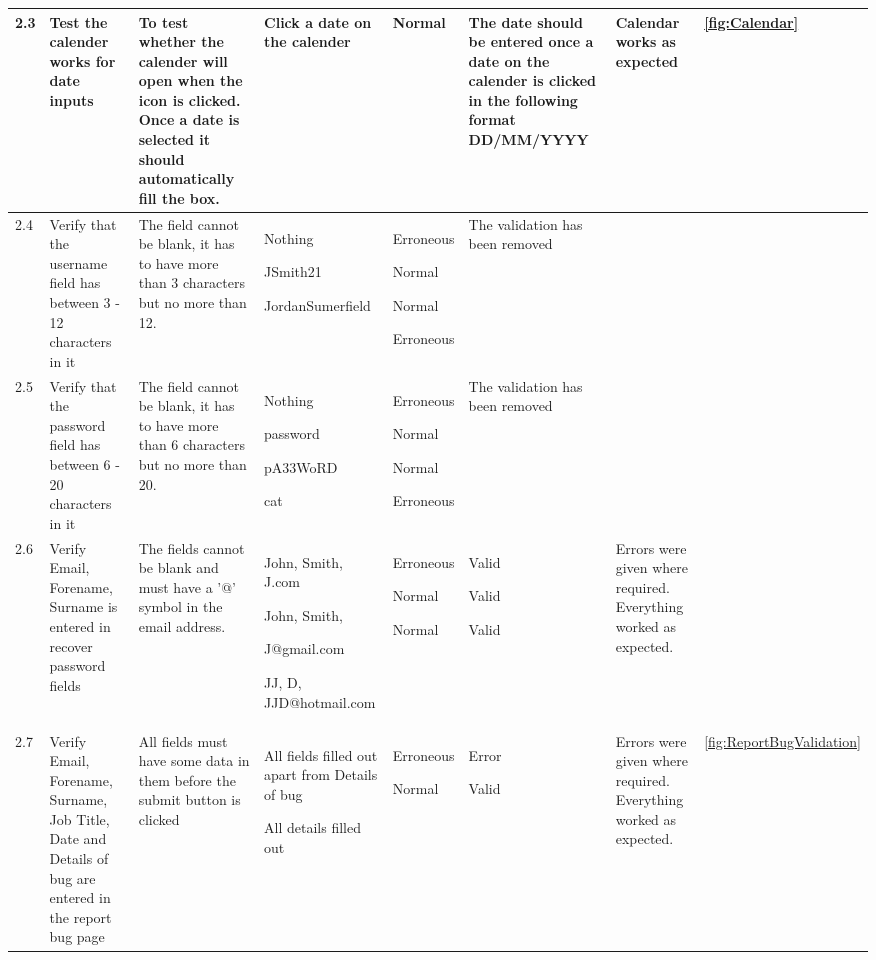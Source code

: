 \begin{landscape}
\begin{center}
\begin{longtable}{|p{1.5cm}|p{2cm}|p{2.5cm}|p{2cm}|p{2cm}|p{2cm}|p{3cm}|p{1.7cm}|}
2.3 & Test the calender works for date inputs & To test whether the calender will open when the icon is clicked. Once a date is selected it should automatically fill the box. & Click a date on the calender & Normal  & The date should be entered once a date on the calender is clicked in the following format DD/MM/YYYY &Calendar works as expected&  \ref {fig:Calendar} \\ \hline
\rowcolor{gray}2.4 & Verify that the username field has between 3 - 12 characters in it & The field cannot be blank, it has to have more than 3 characters but no more than 12. & Nothing \par \bigskip 30597 \par \bigskip JSmith21 \par \bigskip JordanSumerfield &Erroneous \par \bigskip  Normal \par \bigskip Normal \par \bigskip Erroneous &The validation has been removed && \\ \hline
\rowcolor{gray}2.5 & Verify that the password field has between 6 - 20 characters in it & The field cannot be blank, it has to have more than 6 characters but no more than 20. & Nothing \par password \par pA33WoRD \par cat  &Erroneous \par Normal \par Normal \par Erroneous &The validation has been removed && \\ \hline
2.6 & Verify Email, Forename, Surname is entered in recover password fields & The fields cannot be blank and must have a '@' symbol in the email address. & John, Smith, J.com \par  \bigskip John, Smith, \par J@gmail.com \bigskip \par JJ, D, JJD@hotmail.com \par & Erroneous \par \bigskip Normal \par \bigskip \bigskip Normal &  \par Valid \par \bigskip Valid \par \bigskip \bigskip Valid&Errors were given where required. Everything worked as expected.& \\ \hline
2.7 & Verify Email, Forename, Surname, Job Title, Date and Details of bug are entered in the report bug page & All fields must have some data in them before the submit  button is clicked & All fields filled out apart from Details of bug \par \bigskip All details filled out & Erroneous \par \bigskip \bigskip Normal & Error \par\bigskip \bigskip Valid &Errors were given where required. Everything worked as expected.&\ref {fig:ReportBugValidation} \\ \hline

\end{longtable}
\end{center}
\end{landscape}
